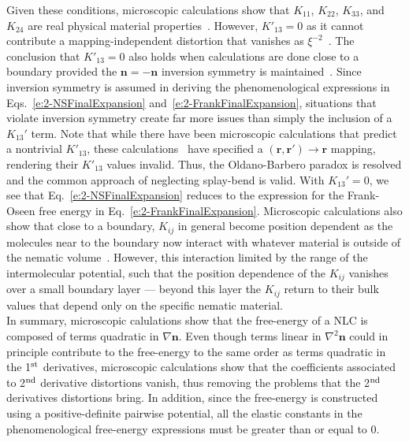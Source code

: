 Given these conditions, microscopic calculations show that $K_{11}$, $K_{22}$, $K_{33}$, and $K_{24}$ are real physical material properties~\cite{RN55,RN56,RN225,RN224,RN217,RN222}.
However, $K'_{13} = 0$ as it cannot contribute a mapping-independent distortion that vanishes as $\xi^{-2}$~\cite{RN55,RN225}.
The conclusion that $K'_{13} = 0$ also holds when calculations are done close to a boundary provided the $\mathbf{n} = -\mathbf{n}$ inversion symmetry is maintained~\cite{RN56}.
Since inversion symmetry is assumed in deriving the phenomenological expressions in Eqs.~\ref{e:2-NSFinalExpansion} and~\ref{e:2-FrankFinalExpansion}, situations that violate inversion symmetry create far more issues than simply the inclusion of a $K_{13}'$ term.
Note that while there have been microscopic calculations that predict a nontrivial $K'_{13}$, these calculations~\cite{RN224,RN217,RN222} have specified a $(\mathbf{r},\mathbf{r}') \rightarrow \mathbf{r}$ mapping, rendering their $K'_{13}$ values invalid.
Thus, the Oldano-Barbero paradox is resolved and the common approach of neglecting splay-bend is valid.
With $K_{13}'=0$, we see that Eq.~\ref{e:2-NSFinalExpansion} reduces to the expression for the Frank-Oseen free energy in Eq.~\ref{e:2-FrankFinalExpansion}.
Microscopic calculations also show that close to a boundary, $K_{ij}$ in general become position dependent as the molecules near to the boundary now interact with whatever material is outside of the nematic volume~\cite{RN56,RN57,RN55}.
However, this interaction limited by the range of the intermolecular potential, such that the position dependence of the $K_{ij}$ vanishes over a small boundary layer --- beyond this layer the $K_{ij}$ return to their bulk values that depend only on the specific nematic material.\\


In summary, microscopic calulations show that the free-energy of a NLC is composed of terms quadratic in $\nabla \mathbf{n}$.
Even though terms linear in $\nabla ^2 \mathbf{n}$ could in principle contribute to the free-energy to the same order as terms quadratic in the 1$^\textup{st}$ derivatives, microscopic calculations show that the coefficients associated to 2$^\textup{nd}$ derivative distortions vanish, thus removing the problems that the 2$^\textup{nd}$ derivatives distortions bring.
In addition, since the free-energy is constructed using a positive-definite pairwise potential, all the elastic constants in the phenomenological free-energy expressions must be greater than or equal to 0.


